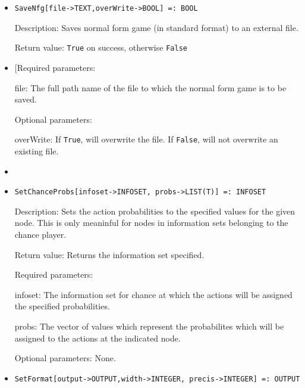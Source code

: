 \begin{itemize}
\item
\protect \large \begin{verbatim}
SaveNfg[file->TEXT,overWrite->BOOL] =: BOOL
\end{verbatim}\normalsize

\bd
\item
[Description:] Saves normal form game (in standard format) to an
external file.  
\item
[Return value:] \verb+True+ on success, otherwise \verb+False+
\item

[Required parameters:

\bd
\item
[file:] The full path name of the file to which the normal form game
is to be saved. \ed

\item
[Optional parameters:]\hfil\null
\bd
\item
[overWrite:] If \verb+True+, will overwrite the file.  If \verb+False+, will
not overwrite an existing file.  
\ed
\ed

\item

\item
\protect \large \begin{verbatim} 
SetChanceProbs[infoset->INFOSET, probs->LIST(T)] =: INFOSET
\end{verbatim}\normalsize

\bd
\item
[Description:] Sets the action probabilities to the specified values
for the given node.  This is only meaninful for nodes in information
sets belonging to the chance player.
\item
[Return value:] Returns the information set specified.
\item
[Required parameters:]\hfil\null
	
\bd
\item
[infoset:] The information set for chance at which the actions will be
assigned the specified probabilities.
\item
[probs:] The vector of values which represent the probabilites which
will be assigned to the actions at the indicated node.
\ed

\item
[Optional parameters:] None.
\ed

\item
\protect \large \begin{verbatim}
SetFormat[output->OUTPUT,width->INTEGER, precis->INTEGER] =: OUTPUT
\end{verbatim}\normalsize



\end{itemize}
